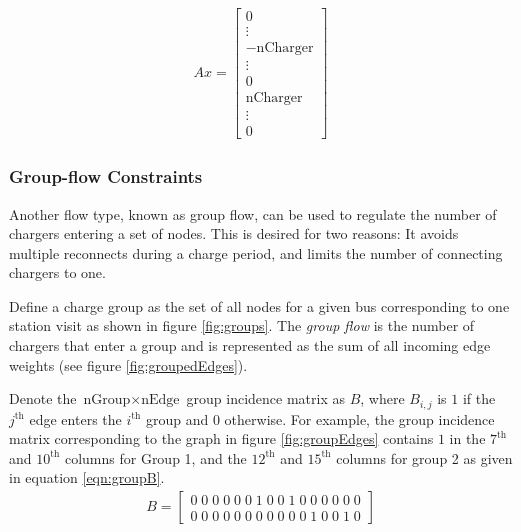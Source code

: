 \begin{align}\label{eqn:cFlow}
	Ax = \begin{bmatrix} 0 \\ \vdots \\ -\text{nCharger} \\ \vdots \\ 0 \\ \text{nCharger} \\ \vdots \\ 0\end{bmatrix}
\end{align}
\subsubsection{Group-flow Constraints}
\par Another flow type, known as group flow, can be used to regulate the number of chargers entering a set of nodes. This is desired for two reasons:  It avoids multiple reconnects during a charge period, and limits the number of connecting chargers to one. 
\par Define a charge group as the set of all nodes for a given bus corresponding to one station visit as shown in figure \ref{fig:groups}. The \textit{group flow} is the number of chargers that enter a group and is represented as the sum of all incoming edge weights (see figure \ref{fig:groupedEdges}). 
\par Denote the $\text{nGroup} \times \text{nEdge}$ group incidence matrix as $B$, where $B_{i,j}$ is $1$ if the $j^{\text{th}}$ edge enters the $i^{\text{th}}$ group and $0$ otherwise. For example, the group incidence matrix corresponding to the graph in figure \ref{fig:groupEdges} contains $1$ in the $7^{\text{th}}$ and $10^{\text{th}}$ columns for Group 1, and the $12^{\text{th}}$ and $15^{\text{th}}$ columns for group 2 as given in equation \ref{eqn:groupB}.
\begin{align}\label{eqn:groupB}
	B = \begin{bmatrix}0 \; 0 \; 0 \; 0 \; 0 \; 0 \; 1 \; 0 \; 0 \; 1 \; 0 \; 0 \; 0 \; 0 \; 0 \; 0\\
	                   0 \; 0 \; 0 \; 0 \; 0 \; 0 \; 0 \; 0 \; 0 \; 0 \; 0 \; 1 \; 0 \; 0 \; 1 \; 0\end{bmatrix}
\end{align}

